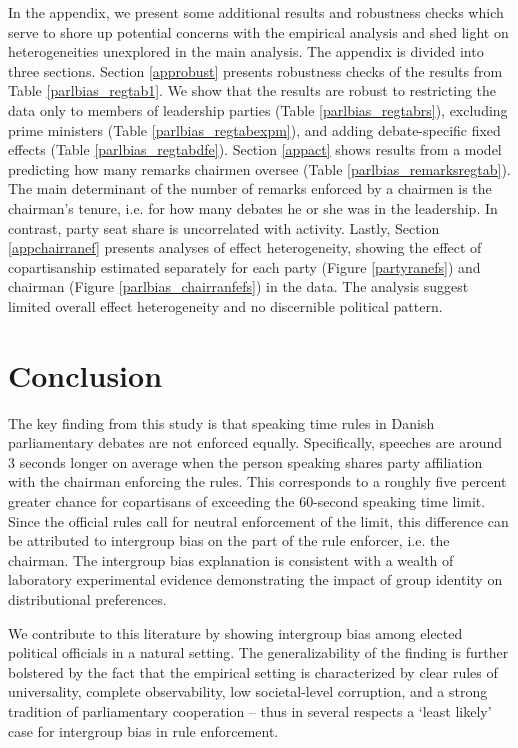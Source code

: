 \documentclass[12pt,a4paper]{article}
\begin{document}
In the appendix, we present some additional results and robustness checks which serve to shore up potential concerns with the empirical analysis and shed light on heterogeneities unexplored in the main analysis. The appendix is divided into three sections. Section \ref{approbust} presents robustness checks of the results from Table \ref{parlbias_regtab1}. We show that the results are robust to restricting the data only to members of leadership parties (Table \ref{parlbias_regtabrs}), excluding prime ministers (Table \ref{parlbias_regtabexpm}), and adding debate-specific fixed effects (Table \ref{parlbias_regtabdfe}). Section \ref{appact} shows results from a model predicting how many remarks chairmen oversee (Table \ref{parlbias_remarksregtab}). The main determinant of the number of remarks enforced by a chairmen is the chairman's tenure, i.e. for how many debates he or she was in the leadership. In contrast, party seat share is uncorrelated with activity. Lastly, Section \ref{appchairranef} presents analyses of effect heterogeneity, showing the effect of copartisanship estimated separately for each party (Figure \ref{partyranefs}) and chairman (Figure \ref{parlbias_chairranfefs}) in the data. The analysis suggest limited overall effect heterogeneity and no discernible political pattern.


\section{Conclusion}\label{conc}

\noindent The key finding from this study is that speaking time rules in Danish parliamentary debates are not enforced equally. Specifically, speeches are around 3 seconds longer on average when the person speaking shares party affiliation with the chairman enforcing the rules. This corresponds to a roughly five percent greater chance for copartisans of exceeding the 60-second speaking time limit. Since the official rules call for neutral enforcement of the limit, this difference can be attributed to intergroup bias on the part of the rule enforcer, i.e. the chairman. The intergroup bias explanation is consistent with a wealth of laboratory experimental evidence demonstrating the impact of group identity on distributional preferences. 

We contribute to this literature by showing intergroup bias among elected political officials in a natural setting. The generalizability of the finding is further bolstered by the fact that the empirical setting is characterized by clear rules of universality, complete observability, low societal-level corruption, and a strong tradition of parliamentary cooperation -- thus in several respects a `least likely' case for intergroup bias in rule enforcement. 
\end{document}
